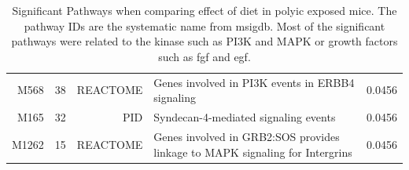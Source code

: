 \begin{landscape}
\begin{table}
\begin{tabular}{rrrp{10cm}r}
			M568&	38&	REACTOME&	Genes involved in PI3K events in ERBB4 signaling&	0.0456\\
			M165&	32&	PID&	Syndecan-4-mediated signaling events&	0.0456\\
			M1262&	15&	REACTOME&	Genes involved in GRB2:SOS provides linkage to MAPK signaling for Intergrins&	0.0456\\
			\bottomrule
		\end{tabular}
		\caption[Significant Pathways When Comparing Effect of Diet in PolyI:C Exposed Mouse]{Significant Pathways when comparing effect of diet in \gls{polyic} exposed mice.
			The pathway IDs are the systematic name from \gls{msigdb}.
			Most of the significant pathways were related to the kinase such as PI3K and MAPK or growth factors such as \gls{fgf} and \gls{egf}.
		}
		\label{tab:o6polyPath}
	\end{table}
	

\end{landscape}
